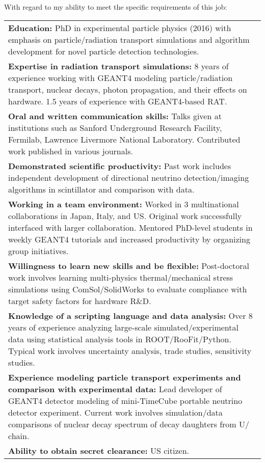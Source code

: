 \documentclass[11pt]{moderncv}        %
\begin{document}
With regard to my ability to meet the specific requirements of this job:
\noindent\begin{tabularx}{\linewidth}{@{{}\textbullet\enskip}X@{\quad}@{}}
	\textbf{Education:} PhD in experimental particle physics (2016) with
	emphasis on particle/radiation transport simulations and algorithm
	development for novel particle detection technologies.\\
	\textbf{Expertise in radiation transport simulations:} 8 years of
	experience working with GEANT4 modeling particle/radiation transport,
	nuclear decays, photon propagation, and their effects on hardware. 1.5
	years of experience with GEANT4-based RAT.\\
	\textbf{Oral and written communication skills:}
	Talks given at institutions such as Sanford Underground Research Facility,
	Fermilab, Lawrence Livermore National Laboratory. Contributed work
	published in various journals.\\
	\textbf{Demonstrated scientific productivity:} Past work includes
	independent development of directional neutrino detection/imaging
	algorithms in scintillator and comparison with data.\\
	\textbf{Working in a team environment:} Worked in 3 multinational
	collaborations in Japan, Italy, and US. Original work successfully
	interfaced with larger collaboration. Mentored PhD-level students in weekly
	GEANT4 tutorials and increased productivity by organizing group
	initiatives.\\
	\textbf{Willingness to learn new skills and be flexible:} Post-doctoral
	work involves learning multi-physics thermal/mechanical stress simulations
	using ComSol/SolidWorks to evaluate compliance with target safety factors
	for hardware R\&D.\\
	\textbf{Knowledge of a scripting language and data analysis:} Over 8 years
	of experience analyzing large-scale simulated/experimental data using
	statistical analysis tools in ROOT/RooFit/Python. Typical work involves
	uncertainty analysis, trade studies, sensitivity studies.\\
	\textbf{Experience modeling particle transport experiments and comparison
	with experimental data:} Lead developer of GEANT4 detector modeling of
	mini-TimeCube portable neutrino detector experiment. Current work involves
	simulation/data comparisons of nuclear decay spectrum of decay daughters
	from \ce{^{238}}U/\ce{^{232}Th} chain.\\
	\textbf{Ability to obtain secret clearance:} US citizen.\\
\end{tabularx}
\end{document}
